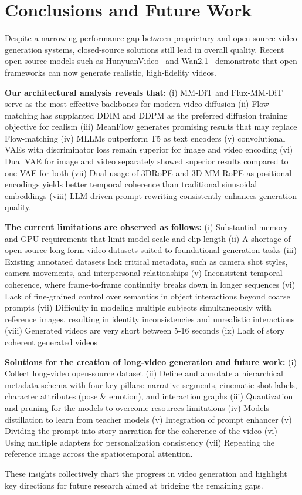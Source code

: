 \section{Conclusions and Future Work}
Despite a narrowing performance gap between proprietary and open‐source video generation systems, closed‐source solutions still lead in overall quality. Recent open‐source models such as HunyuanVideo~\cite{kong2024hunyuanvideo} and Wan2.1~\cite{wan2025} demonstrate that open frameworks can now generate realistic, high‐fidelity videos.

\textbf{Our architectural analysis reveals that:} (i) MM‐DiT and Flux‐MM‐DiT serve as the most effective backbones for modern video diffusion (ii) Flow matching has supplanted DDIM and DDPM as the preferred diffusion training objective for realism (iii) MeanFlow generates promising results that may replace Flow-matching (iv) MLLMs outperform T5 as text encoders  (v) convolutional VAEs with discriminator loss remain superior for image and video encoding (vi) Dual VAE for image and video separately showed superior results compared to one VAE for both (vii) Dual usage of 3DRoPE and 3D MM‐RoPE as positional encodings yields better temporal coherence than traditional sinusoidal embeddings (viii) LLM‐driven prompt rewriting consistently enhances generation quality.

\textbf{The current limitations are observed as follows:} (i) Substantial memory and GPU requirements that limit model scale and clip length (ii) A shortage of open‐source long‐form video datasets suited to foundational generation tasks (iii) Existing annotated datasets lack critical metadata, such as camera shot styles, camera movements, and interpersonal relationships (v) Inconsistent temporal coherence, where frame‐to‐frame continuity breaks down in longer sequences (vi) Lack of fine‐grained control over semantics in object interactions beyond coarse prompts (vii) Difficulty in modeling multiple subjects simultaneously with reference images, resulting in identity inconsistencies and unrealistic interactions (viii) Generated videos are very short between 5-16 seconds (ix) Lack of story coherent generated videos

\textbf{Solutions for the creation of long-video generation and future work:} (i) Collect long-video open-source dataset (ii) Define and annotate a hierarchical metadata schema with four key pillars: narrative segments, cinematic shot labels, character attributes (pose \& emotion), and interaction graphs (iii) Quantization and pruning for the models to overcome resources limitations (iv) Models distillation to learn from teacher models (v) Integration of prompt enhancer (v) Dividing the prompt into story narration for the coherence of the video (vi) Using multiple adapters for personalization consistency (vii) Repeating the reference image across the spatiotemporal attention.

These insights collectively chart the progress in video generation and highlight key directions for future research aimed at bridging the remaining gaps.

\label{sec:conc}